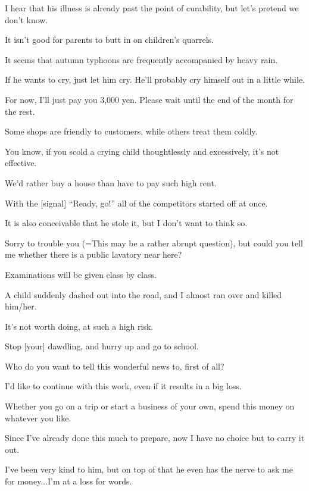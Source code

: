 \item[139.] I hear that his illness is already past the point of curability, but let's pretend we don't know.
\item[140.] It isn't good for parents to butt in on children's quarrels.
\item[141.] It seems that autumn typhoons are frequently accompanied by heavy rain.
\item[142.] If he wants to cry, just let him cry.  He'll probably cry himself out in a little while.
\item[143.] For now, I'll just pay you 3,000 yen.  Please wait until the end of the month for the rest.
\item[144.] Some shops are friendly to customers, while others treat them coldly.
\item[145.] You know, if you scold a crying child thoughtlessly and excessively, it's not effective.
\item[146.] We'd rather buy a house than have to pay such high rent.
\item[147.] With the [signal] ``Ready, go!'' all of the competitors started off at once.
\item[148.] It is also conceivable that he stole it, but I don't want to think so.
\item[149.] Sorry to trouble you (=This may be a rather abrupt question), but could you tell me whether there is a public lavatory near here?
\item[150.] Examinations will be given class by class.
\item[151.] A child suddenly dashed out into the road, and I almost ran over and killed him/her.
\item[152.] It's not worth doing, at such a high risk.
\item[153.] Stop [your] dawdling, and hurry up and go to school.
\item[154.] Who do you want to tell this wonderful news to, first of all?
\item[155.] I'd like to continue with this work, even if it results in a big loss.
\item[156.] Whether you go on a trip or start a business of your own, spend this money on whatever you like.
\item[157.] Since I've already done this much to prepare, now I have no choice but to carry it out.
\item[158.] I've been very kind to him, but on top of that he even has the nerve to ask me for money...I'm at a loss for words.
